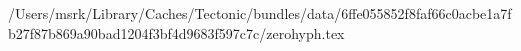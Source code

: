 /Users/msrk/Library/Caches/Tectonic/bundles/data/6ffe055852f8faf66c0acbe1a7fb27f87b869a90bad1204f3bf4d9683f597c7c/zerohyph.tex